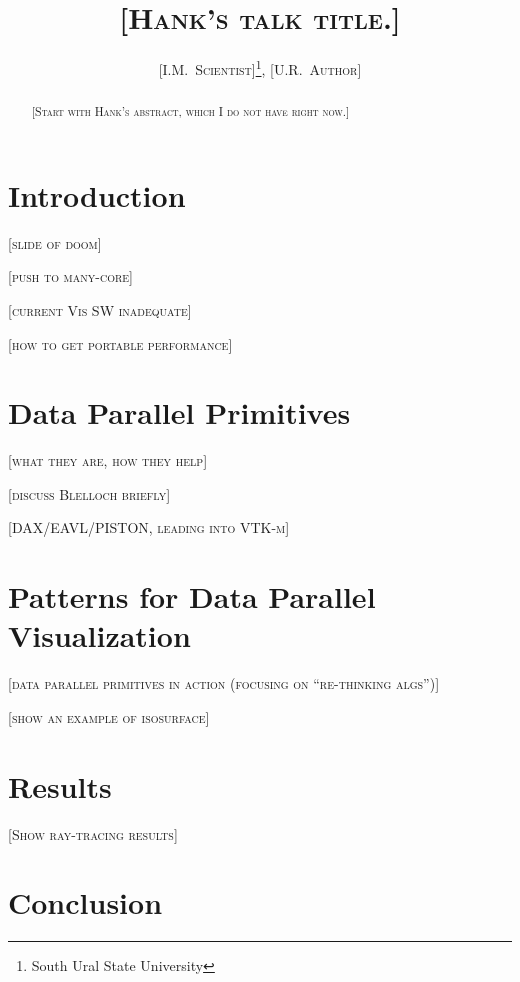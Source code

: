 \documentclass{superfri}
\newcommand{\fix}[1]{{\color{red}\textsc{[#1]}}}
\begin{document}
\author{\fix{I.M.~Scientist}\footnote{\label{susu}South Ural State University}, \fix{U.R.~Author}}

\title{\fix{Hank's talk title.}}

\maketitle{}

\begin{abstract}%
  \fix{Start with Hank's abstract, which I do not have right now.}

\end{abstract}


\section*{Introduction}
\label{sec:Introduction}

\fix{slide of doom}

\fix{push to many-core}

\fix{current Vis SW inadequate}

\fix{how to get portable performance}

\section{Data Parallel Primitives}

\fix{what they are, how they help}

\fix{discuss Blelloch briefly}

\fix{DAX/EAVL/PISTON, leading into VTK-m}


\section{Patterns for Data Parallel Visualization}

\fix{data parallel primitives in action (focusing on ``re-thinking algs'')}

\fix{show an example of isosurface}


\section{Results}

\fix{Show ray-tracing results}


\section{Conclusion}
\end{document}
